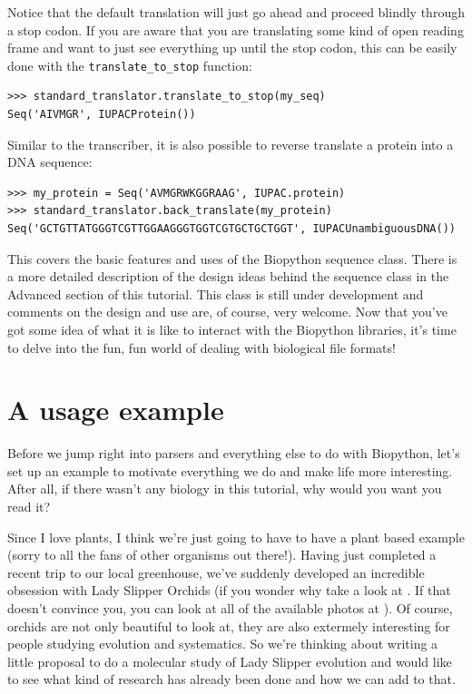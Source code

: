 \documentclass{report}
\begin{document}
Notice that the default translation will just go ahead and proceed blindly through a stop codon. If you are aware that you are translating some kind of open reading frame and want to just see everything up until the stop codon, this can be easily done with the \verb|translate_to_stop| function:

\begin{verbatim}
>>> standard_translator.translate_to_stop(my_seq)
Seq('AIVMGR', IUPACProtein())
\end{verbatim}

Similar to the transcriber, it is also possible to reverse translate a protein into a DNA sequence:

\begin{verbatim}
>>> my_protein = Seq('AVMGRWKGGRAAG', IUPAC.protein)
>>> standard_translator.back_translate(my_protein)
Seq('GCTGTTATGGGTCGTTGGAAGGGTGGTCGTGCTGCTGGT', IUPACUnambiguousDNA())
\end{verbatim}

This covers the basic features and uses of the Biopython sequence class. There is a more detailed description of the design ideas behind the sequence class in the Advanced section of this tutorial. This class is still under development and comments on the design and use are, of course, very welcome. Now that you've got some idea of what it is like to interact with the Biopython libraries, it's time to delve into the fun, fun world of dealing with biological file formats!

\section{A usage example}
\label{sec:orchids}

Before we jump right into parsers and everything else to do with Biopython, let's set up an example to motivate everything we do and make life more interesting. After all, if there wasn't any biology in this tutorial, why would you want you read it?


Since I love plants, I think we're just going to have to have a plant based example (sorry to all the fans of other organisms out there!).  Having just completed a recent trip to our local greenhouse, we've suddenly developed an incredible obsession with Lady Slipper Orchids (if you wonder why take a look at . If that doesn't convince you, you can look at all of the available photos at  ).  Of course, orchids are not only beautiful to look at, they are also extermely interesting for people studying evolution and systematics. So we're thinking about writing a little proposal to do a molecular study of Lady Slipper evolution and would like to see what kind of research has already been done and how we can add to that.
\end{document}
